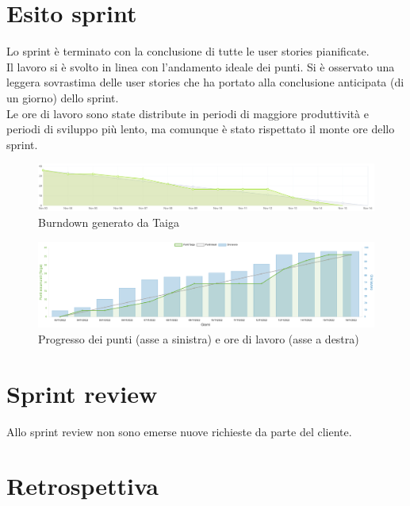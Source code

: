 \documentclass[11pt]{article}
\begin{document}
\section*{Esito sprint}
Lo sprint è terminato con la conclusione di tutte le user stories pianificate.\\
Il lavoro si è svolto in linea con l'andamento ideale dei punti. 
Si è osservato una leggera sovrastima delle user stories che ha portato alla conclusione anticipata (di un giorno) dello sprint.\\
Le ore di lavoro sono state distribute in periodi di maggiore produttività e periodi di sviluppo più lento, ma comunque è stato rispettato il monte ore dello sprint.
\begin{figure}[H]
    \centering
    \includegraphics[width=\textwidth]{./img/burndown.png}
    \caption{Burndown generato da Taiga}
\end{figure}

\begin{figure}[H]
    \centering
    \includegraphics[width=\textwidth]{./img/worktime.png}
    \caption{Progresso dei punti (asse a sinistra) e ore di lavoro (asse a destra)}
\end{figure}

\section*{Sprint review}
Allo sprint review non sono emerse nuove richieste da parte del cliente.

\newpage
\section*{Retrospettiva}
\end{document}
